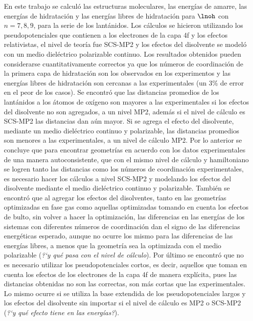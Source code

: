 En este trabajo se calculó las estructuras moleculares, las 
energías de amarre, las energías de hidratación y las
energías libres de hidratación para $\lnoh$ con $n=7, 8, 9$, para
la serie de los lantánidos. Los cálculos se hicieron utilizando
los pseudopotenciales que contienen a los electrones de la capa 4f y
los efectos relativistas, el nivel de teoría fue SCS-MP2 y los 
efectos del disolvente se modeló con un medio dieléctrico 
polarizable continuo. Los resultados obtenidos pueden considerarse 
cuantitativamente correctos ya que los números de coordinación de
la primera capa de hidratación son los observados en los 
experimentos y las energías libres de hidratación son
cercanas a las experimentales (un 3\% de error en el peor de los 
casos). Se encontró que las distancias promedios de los 
lantánidos a los átomos de oxígeno son mayores a las 
experimentales si los efectos del disolvente no son agregados, a un 
nivel MP2, además si el nivel de cálculo es SCS-MP2 las 
distancias dan aún mayor. Si se agrega el efecto del disolvente, 
mediante un medio dieléctrico continuo y polarizable, las 
distancias promedios son menores a las experimentales, a un nivel de 
cálculo MP2. Por lo anterior se concluye que para encontrar 
geometrías en acuerdo con los datos experimentales de una manera 
autoconsistente, que con el mismo nivel de cálculo y hamiltoniano 
se logren tanto las distancias como los números de coordinación 
experimentales, es necesario hacer los cálculos a nivel SCS-MP2 y
modelando los efectos del disolvente mediante el medio dieléctrico
continuo y polarizable. También se encontró que al agregar los
efectos del disolventes, tanto en las geometrías optimizadas en 
fase gas como aquellas optimizadas tomando en cuenta los efectos de
bulto, sin volver a hacer la optimización, las diferencias en las 
energías de los sistemas con diferentes números de coordinación
dan el signo de las diferencias energéticas esperado, aunque no 
ocurre los mismo para las diferencias de las energías libres, a 
menos que la geometría sea la optimizada con
el medio polarizable ({\it ?`y qué pasa con el nivel de 
cálculo}). Por último se encontró que no es necesario utilizar 
los pseudopotenciales cortos, es decir, aquellos que toman
en cuenta los efectos de los electrones de la capa 4f de manera 
explícita, pues las distancias obtenidas no son las correctas, son
más cortas que las experimentales. Lo mismo ocurre si se utiliza la
base extendida de los pseudopotenciales largos y los efectos del 
disolvente sin importar si el nivel de cálculo es MP2 o SCS-MP2 
({\it ?`y qué efecto tiene en las energías?}). 

